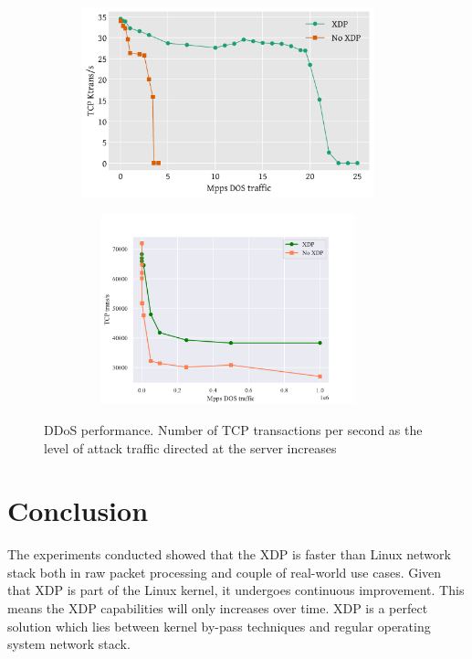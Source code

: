 \documentclass[12pt,titlepage]{article}
\begin{document}
\begin{figure}
    \centering
    \begin{minipage}{0.49\textwidth}
        \centering
        \includegraphics[width=0.95\textwidth,height=5.5cm]{original/ddos-test.pdf} %
        \label{graph:ddos:a}
    \end{minipage}\hfill
    \begin{minipage}{0.49\textwidth}
        \centering
        \includegraphics[width=0.95\textwidth,height=5.5cm]{img/dos-test.pdf} %
        \label{graph:ddos:b}
    \end{minipage}
     \caption{DDoS performance. Number of TCP transactions per second as the level of attack traffic directed at the server increases}
     \label{graph:ddos}
\end{figure}


\section{Conclusion}

The experiments conducted showed that the XDP is faster than Linux network stack both in raw packet processing and couple of real-world use cases. Given that XDP is part of the Linux kernel, it undergoes continuous improvement. This means the XDP capabilities will only increases over time. XDP is a perfect solution which lies between kernel by-pass techniques and regular operating  system network stack. 
\end{document}
